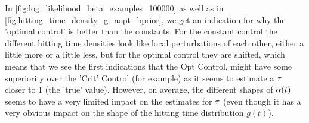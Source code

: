 In \cref{fig:log_likelihood_beta_examples_100000} as well as in 
\cref{fig:hitting_time_density_g_aopt_bprior}, we get an indication for why
the 'optimal control' is better than the constants. For the constant control
the different hitting time densities look like local perturbations of each
other, either a little more or a little less, but for the optimal control they
are shifted, which means that we see the first indications that the Opt Control,
might have some superiority over the 'Crit' Control (for example) as it seems to estimate a ${ \tau }$ closer to 1 (the 'true' value). However, on average, the different shapes of $\alpha(t)$ seems to have a very limited impact on the estimates for ${ \tau }$ (even though it has a very obvious impact on the shape of the hitting time distribution $g(t)$).


% 
% 


